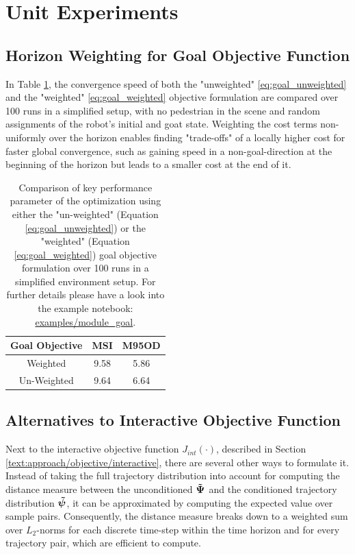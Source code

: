 \section{Unit Experiments}
\label{text:experiments/unit}

\subsection{Horizon Weighting for Goal Objective Function}
In Table \ref{table:goal_horizon_weighting}, the convergence speed of both the "unweighted" \ref{eq:goal_unweighted} and the "weighted" \ref{eq:goal_weighted} objective formulation are compared over 100 runs in a simplified setup, with no pedestrian in the scene and random assignments of the robot's initial and goat state. Weighting the cost terms non-uniformly over the horizon enables finding "trade-offs" of a locally higher cost for faster global convergence, such as gaining speed in a non-goal-direction at the beginning of the horizon but leads to a smaller cost at the end of it.

\begin{table}[!ht]
\begin{center}
\begin{tabular}{c|c|c}
\bf Goal Objective & \bf MSI & \bf M95OD \\
\hline
Weighted & 9.58 & 5.86 \\
\hline
Un-Weighted & 9.64 & 6.64 \\
\end{tabular}
\caption{Comparison of key performance parameter of the optimization using either the "un-weighted" (Equation \ref{eq:goal_unweighted}) or the "weighted" (Equation  \ref{eq:goal_weighted}) goal objective formulation over 100 runs in a simplified environment setup. For further details please have a look into the example notebook: \href{https://github.com/simon-schaefer/mantrap/blob/master/examples/module_goal.ipynb}{examples/module\_goal}.}
\label{table:goal_horizon_weighting}
\end{center}
\end{table}

\subsection{Alternatives to Interactive Objective Function}
Next to the interactive objective function $J_{int}(\cdot)$, described in Section \ref{text:approach/objective/interactive}, there are several other ways to formulate it. Instead of taking the full trajectory distribution into account for computing the distance measure between the unconditioned $\distwo[]$ and the conditioned trajectory distribution $\dist[]$, it can be approximated by computing the expected value over sample pairs. Consequently, the distance measure breaks down to a weighted sum over $L_2$-norms for each discrete time-step within the time horizon and for every trajectory pair, which are efficient to compute.

